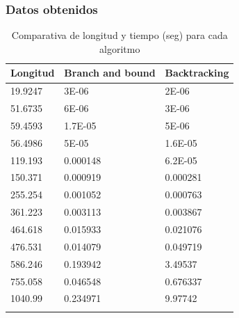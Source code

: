 \documentclass[spanish]{beamer}
\begin{document}
\begin{frame}[fragile]\frametitle{Datos obtenidos}	
\begin{table}[H]
	\centering
	\caption{Comparativa de longitud y tiempo (seg) para cada algoritmo}
	\label{my-label}
	\begin{tabular}{lll}
		\hline
		\multicolumn{1}{|l|}{Longitud} & \multicolumn{1}{l|}{Branch and bound} & \multicolumn{1}{l|}{Backtracking} \\ \hline
		\multicolumn{1}{|l|}{19.9247}  & \multicolumn{1}{l|}{3E-06}            & \multicolumn{1}{l|}{2E-06}        \\ \hline
		\multicolumn{1}{|l|}{51.6735}  & \multicolumn{1}{l|}{6E-06}            & \multicolumn{1}{l|}{3E-06}        \\ \hline
		\multicolumn{1}{|l|}{59.4593}  & \multicolumn{1}{l|}{1.7E-05}          & \multicolumn{1}{l|}{5E-06}        \\ \hline
		\multicolumn{1}{|l|}{56.4986}  & \multicolumn{1}{l|}{5E-05}            & \multicolumn{1}{l|}{1.6E-05}      \\ \hline
		\multicolumn{1}{|l|}{119.193}  & \multicolumn{1}{l|}{0.000148}         & \multicolumn{1}{l|}{6.2E-05}      \\ \hline
		\multicolumn{1}{|l|}{150.371}  & \multicolumn{1}{l|}{0.000919}         & \multicolumn{1}{l|}{0.000281}     \\ \hline
		\multicolumn{1}{|l|}{255.254}  & \multicolumn{1}{l|}{0.001052}         & \multicolumn{1}{l|}{0.000763}     \\ \hline
		\multicolumn{1}{|l|}{361.223}  & \multicolumn{1}{l|}{0.003113}         & \multicolumn{1}{l|}{0.003867}     \\ \hline
		\multicolumn{1}{|l|}{464.618}  & \multicolumn{1}{l|}{0.015933}         & \multicolumn{1}{l|}{0.021076}     \\ \hline
		\multicolumn{1}{|l|}{476.531}  & \multicolumn{1}{l|}{0.014079}         & \multicolumn{1}{l|}{0.049719}     \\ \hline
		\multicolumn{1}{|l|}{586.246}  & \multicolumn{1}{l|}{0.193942}         & \multicolumn{1}{l|}{3.49537}      \\ \hline
		\multicolumn{1}{|l|}{755.058}  & \multicolumn{1}{l|}{0.046548}         & \multicolumn{1}{l|}{0.676337}     \\ \hline
		\multicolumn{1}{|l|}{1040.99}  & \multicolumn{1}{l|}{0.234971}         & \multicolumn{1}{l|}{9.97742}      \\ \hline
		&                                       &                                  
	\end{tabular}
\end{table}
\end{frame}
\end{document}
